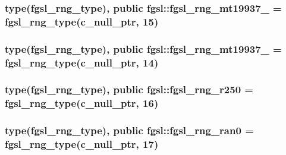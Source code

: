 \hypertarget{classfgsl_a984a8a295a9ec6b581b70421f780df53}{
\subsubsection[{fgsl\-\_\-rng\-\_\-mt19937\-\_\-1998}]{\setlength{\rightskip}{0pt plus 5cm}type({\bf fgsl\-\_\-rng\-\_\-type}), public fgsl\-::fgsl\-\_\-rng\-\_\-mt19937\-\_ = {\bf fgsl\-\_\-rng\-\_\-type}(c\-\_\-null\-\_\-ptr, 15)}}\label{classfgsl_a984a8a295a9ec6b581b70421f780df53}
\hypertarget{classfgsl_a9e349dde1852d8ef9eb4bbdcc9de661a}{
\subsubsection[{fgsl\-\_\-rng\-\_\-mt19937\-\_\-1999}]{\setlength{\rightskip}{0pt plus 5cm}type({\bf fgsl\-\_\-rng\-\_\-type}), public fgsl\-::fgsl\-\_\-rng\-\_\-mt19937\-\_ = {\bf fgsl\-\_\-rng\-\_\-type}(c\-\_\-null\-\_\-ptr, 14)}}\label{classfgsl_a9e349dde1852d8ef9eb4bbdcc9de661a}
\hypertarget{classfgsl_ada1200ead9fd55af5e211bdd3666dea1}{
\subsubsection[{fgsl\-\_\-rng\-\_\-r250}]{\setlength{\rightskip}{0pt plus 5cm}type({\bf fgsl\-\_\-rng\-\_\-type}), public fgsl\-::fgsl\-\_\-rng\-\_\-r250 = {\bf fgsl\-\_\-rng\-\_\-type}(c\-\_\-null\-\_\-ptr, 16)}}\label{classfgsl_ada1200ead9fd55af5e211bdd3666dea1}
\hypertarget{classfgsl_a355fcde51e3f3a5d6ad8ea548e7cdb0c}{
\subsubsection[{fgsl\-\_\-rng\-\_\-ran0}]{\setlength{\rightskip}{0pt plus 5cm}type({\bf fgsl\-\_\-rng\-\_\-type}), public fgsl\-::fgsl\-\_\-rng\-\_\-ran0 = {\bf fgsl\-\_\-rng\-\_\-type}(c\-\_\-null\-\_\-ptr, 17)}}\label{classfgsl_a355fcde51e3f3a5d6ad8ea548e7cdb0c}
